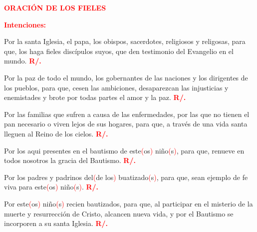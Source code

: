 \documentclass[12pt, letterpaper]{report}
\begin{document}
\Large {\bfseries \textcolor{red}{ORACI\'ON DE LOS FIELES}} 

\noindent
\large {\bfseries \textcolor{red}{Intenciones:}} 

\Large {Por la santa Iglesia, el papa, los obispos, sacerdotes, religiosos y religosas, para que, los haga fieles disc\'ipulos suyos, que den testimonio del Evangelio en el mundo.
\hspace{1cm} \bfseries \textcolor{red}{R/.}}

\Large {Por la paz de todo el mundo, los gobernantes de las naciones y los dirigentes de los pueblos, para que, cesen las ambiciones, desaparezcan las injusticias y enemistades y brote por todas partes el amor y la paz. 
\hspace{1cm} \bfseries \textcolor{red}{R/.}}

\Large {Por las familias que sufren a causa de las enfermedades, por las que no tienen el pan necesario o viven lejos de sus hogares, para que, a trav\'es de una vida santa lleguen al Reino de los cielos.
\hspace{1cm} \bfseries \textcolor{red}{R/.}}

\Large {Por los aqui presentes en el bautismo de este\textcolor{red}{(}os\textcolor{red}{)} ni\~no\textcolor{red}{(}s\textcolor{red}{)}, para que, renueve en todos nosotros la gracia del Bautismo. 
\hspace{1cm} \bfseries \textcolor{red}{R/.}}

\Large {Por los padres y padrinos del\textcolor{red}{(}de los\textcolor{red}{)} buatizado\textcolor{red}{(}s\textcolor{red}{)}, para que, sean ejemplo de fe viva para este\textcolor{red}{(}os\textcolor{red}{)} ni\~no\textcolor{red}{(}s\textcolor{red}{)}.
\hspace{1cm} \bfseries \textcolor{red}{R/.}}

\Large {Por este\textcolor{red}{(}os\textcolor{red}{)} ni\~no\textcolor{red}{(}s\textcolor{red}{)} recien bautizados, para que, al participar en el misterio de la muerte y resurrecci\'on de Cristo, alcancen nueva vida, y por el Bautismo se incorporen a su santa Iglesia.
\hspace{1cm} \bfseries \textcolor{red}{R/.}}
\end{document}
